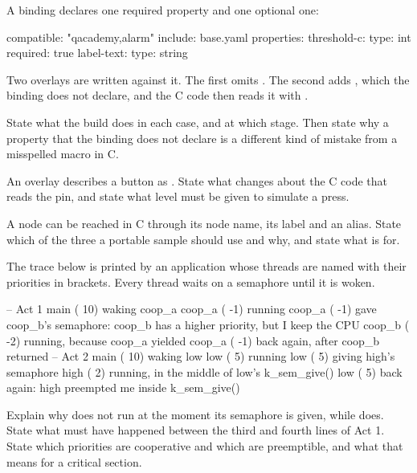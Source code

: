 A binding declares one required property and one optional one:

\begin{yamlcode}
compatible: "qacademy,alarm"
include: base.yaml
properties:
  threshold-c:
    type: int
    required: true
  label-text:
    type: string
\end{yamlcode}

\noindent Two overlays are written against it. The first omits . The second adds
, which the binding does not declare, and the C code then reads it with
.

State what the build does in each case, and at which stage. Then state why a property that the
binding does not declare is a different kind of mistake from a misspelled  macro in C.

 An overlay describes a button as
. State what 
changes about the C code that reads the pin, and state what level  must
be given to simulate a press. 

 A node can be reached in C through its node name, its label and an alias. State which of
the three a portable sample should use and why, and state what  is for.

\label{exa:q:4}

 The trace below is printed by an application whose threads are named with their priorities
in brackets. Every thread waits on a semaphore until it is woken.

\begin{console}
-- Act 1
main   ( 10)  waking coop_a
coop_a ( -1)  running
coop_a ( -1)  gave coop_b's semaphore: coop_b has a higher priority, but I keep the CPU
coop_b ( -2)  running, because coop_a yielded
coop_a ( -1)  back again, after coop_b returned
-- Act 2
main   ( 10)  waking low
low    (  5)  running
low    (  5)  giving high's semaphore
high   (  2)  running, in the middle of low's k_sem_give()
low    (  5)  back again: high preempted me inside k_sem_give()
\end{console}

\noindent Explain why  does not run at the moment its semaphore is given, while
 does. State what must have happened between the third and fourth lines of Act 1. State
which priorities are cooperative and which are preemptible, and what that means for a critical
section. 

